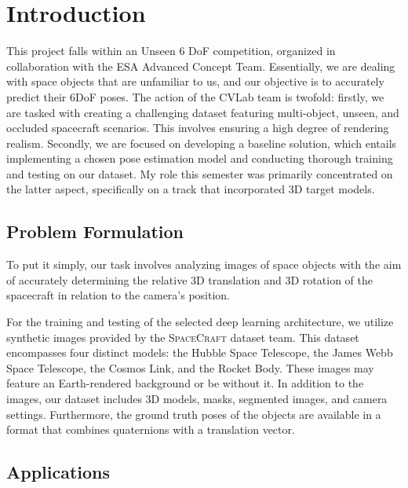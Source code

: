 
\chapter{Introduction}\label{chapter:introduction}
\renewcommand{\headrulewidth}{0.4pt}

This project falls within an Unseen 6 \ac{DoF} competition, organized in collaboration with the \ac{ESA} Advanced Concept Team. Essentially, we are dealing with space objects that are unfamiliar to us, and our objective is to accurately predict their 6\ac{DoF} poses. The action of the \ac{CVLab} team is twofold: firstly, we are tasked with creating a challenging dataset featuring multi-object, unseen, and occluded spacecraft scenarios. This involves ensuring a high degree of rendering realism. Secondly, we are focused on developing a baseline solution, which entails implementing a chosen pose estimation model and conducting thorough training and testing on our dataset. My role this semester was primarily concentrated on the latter aspect, specifically on a track that incorporated 3D target models.

\section{Problem Formulation}

To put it simply, our task involves analyzing images of space objects with the aim of accurately determining the relative 3D translation and 3D rotation of the spacecraft in relation to the camera's position.

For the training and testing of the selected deep learning architecture, we utilize synthetic images provided by the \textsc{SpaceCraft} dataset team. This dataset encompasses four distinct models: the Hubble Space Telescope, the James Webb Space Telescope, the Cosmos Link, and the Rocket Body. These images may feature an Earth-rendered background or be without it. In addition to the images, our dataset includes 3D models, masks, segmented images, and camera settings. Furthermore, the ground truth poses of the objects are available in a format that combines quaternions with a translation vector.

\section{Applications}

